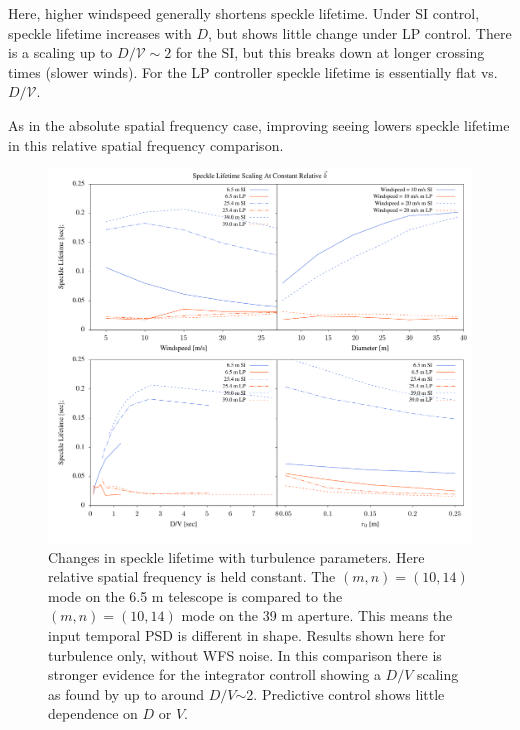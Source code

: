 \documentclass[10pt,preprint]{aastex631}
\begin{document}
Here, higher windspeed generally shortens speckle lifetime.  Under SI control, speckle lifetime increases with $D$, but shows little change under LP control.  There is a scaling up to $D/\mathcal{V} \sim 2$ for the SI, but this breaks down at longer crossing times (slower winds). For the LP controller speckle lifetime is essentially flat vs. $D/\mathcal{V}$.

As in the absolute spatial frequency case, improving seeing lowers speckle lifetime in this relative spatial frequency comparison.

\begin{figure}
\includegraphics[width=5.5in]{scalings_rel.pdf}
\caption{Changes in speckle lifetime with turbulence parameters.  Here relative spatial frequency is held constant.  The $(m,n)=(10,14)$ mode on the 6.5 m telescope is compared to the $(m,n)=(10,14)$ mode on the 39 m aperture.  This means the input temporal PSD is different in shape.  Results shown here for turbulence only, without WFS noise. In this comparison there is stronger evidence for the integrator controll showing a $D/V$ scaling as found by \citet{2005SPIE.5903..170M} up to around $D/V$$\sim$2. Predictive control shows little dependence on $D$ or $V$.  
\label{fig:scalings_rel}
}
\end{figure}
\end{document}

